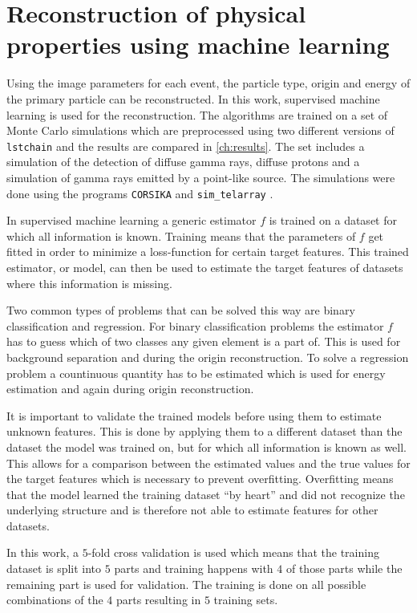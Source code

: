 \chapter{Reconstruction of physical properties using machine learning}
\label{ch:ml}
Using the image parameters for each event, the particle type, origin and energy of the primary particle can be reconstructed.
In this work, supervised machine learning is used for the reconstruction.
The algorithms are trained on a set of Monte Carlo simulations which are preprocessed using two different versions of \texttt{lstchain} 
and the results are compared in \autoref{ch:results}.
The set includes a simulation of the detection of diffuse gamma rays, diffuse protons and a simulation of gamma rays emitted by a point-like source.
The simulations were done using the programs \texttt{CORSIKA} and \texttt{sim\_telarray} \cite{simulations}.

In supervised machine learning a generic estimator $f$ is trained on a dataset for which all information is known.
Training means that the parameters of $f$ get fitted in order to minimize a loss-function for certain target features.
This trained estimator, or model, can then be used to estimate the target features of datasets where this information is missing.

Two common types of problems that can be solved this way are binary classification and regression. 
For binary classification problems the estimator $f$ has to guess which of two classes any given element is a part of. 
This is used for background separation and during the origin reconstruction.
To solve a regression problem a countinuous quantity has to be estimated which is used for energy estimation and again during origin reconstruction.

It is important to validate the trained models before using them to estimate unknown features.
This is done by applying them to a different dataset than the dataset the model was trained on, but for which all information is known as well.
This allows for a comparison between the estimated values and the true values for the target features which is necessary to prevent overfitting.
Overfitting means that the model learned the training dataset \enquote{by heart} and did not recognize the underlying structure and is therefore not able
to estimate features for other datasets.

In this work, a $\num{5}$-fold cross validation is used which means that the training dataset is split into $\num{5}$ parts and training happens 
with $\num{4}$ of those parts while the remaining part is used for validation. 
The training is done on all possible combinations of the $\num{4}$ parts resulting in $\num{5}$ training sets.


